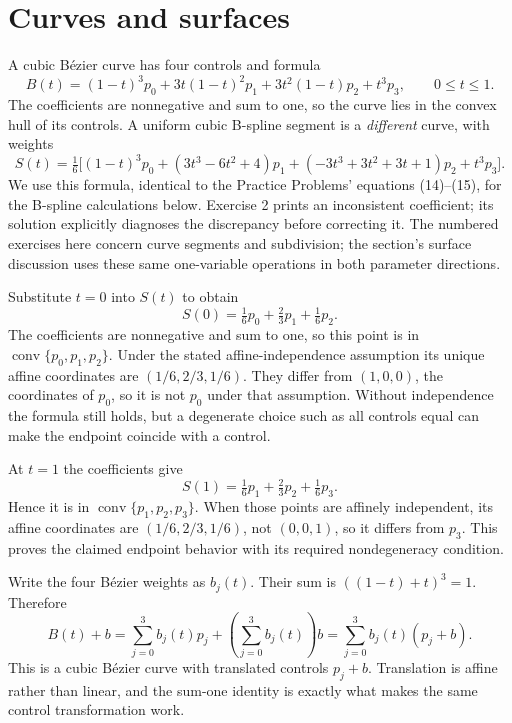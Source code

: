 \section{Curves and surfaces}
A cubic B\'ezier curve has four controls and formula
\[
 B(t)=(1-t)^3p_0+3t(1-t)^2p_1+3t^2(1-t)p_2+t^3p_3,\qquad0\le t\le1.
\]
The coefficients are nonnegative and sum to one, so the curve lies in
the convex hull of its controls. A uniform cubic B-spline segment is a
\emph{different} curve, with weights
\[
 S(t)=\tfrac16\big[(1-t)^3p_0+(3t^3-6t^2+4)p_1
 +(-3t^3+3t^2+3t+1)p_2+t^3p_3\big].
\]
We use this formula, identical to the Practice Problems' equations (14)--(15),
for the B-spline calculations below. Exercise 2 prints an inconsistent
coefficient; its solution explicitly diagnoses the discrepancy before correcting it.
The numbered exercises here concern curve segments and subdivision; the
section's surface discussion uses these same one-variable operations in
both parameter directions.

Substitute $t=0$ into $S(t)$ to obtain
\[
 S(0)=\tfrac16p_0+\tfrac23p_1+\tfrac16p_2.
\]
The coefficients are nonnegative and sum to one, so this point is in
$\operatorname{conv}\{p_0,p_1,p_2\}$.
Under the stated affine-independence assumption its unique affine
coordinates are $(1/6,2/3,1/6)$. They differ from $(1,0,0)$, the
coordinates of $p_0$, so it is not $p_0$ under that assumption.
Without independence the formula still holds, but a degenerate choice such
as all controls equal can make the endpoint coincide with a control.

At $t=1$ the coefficients give
\[
 S(1)=\tfrac16p_1+\tfrac23p_2+\tfrac16p_3.
\]
Hence it is in $\operatorname{conv}\{p_1,p_2,p_3\}$.
When those points are affinely independent, its affine coordinates are
$(1/6,2/3,1/6)$, not $(0,0,1)$, so it differs from $p_3$.
This proves the claimed endpoint behavior with its required nondegeneracy condition.

Write the four B\'ezier weights as $b_j(t)$. Their sum is
$((1-t)+t)^3=1$. Therefore
\[
 B(t)+b=\sum_{j=0}^3 b_j(t)p_j+\left(\sum_{j=0}^3b_j(t)\right)b
       =\sum_{j=0}^3b_j(t)(p_j+b).
\]
This is a cubic B\'ezier curve with translated controls $p_j+b$.
Translation is affine rather than linear, and the sum-one identity is
exactly what makes the same control transformation work.

